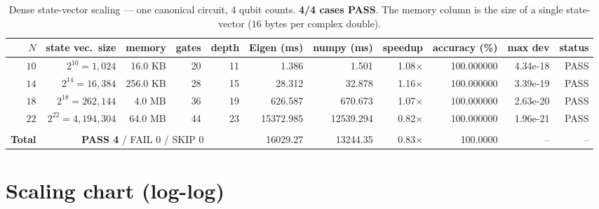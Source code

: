 \documentclass[11pt,a4paper]{article}
\begin{document}
\begin{table}[h]
\centering
\small
\setlength{\tabcolsep}{4pt}
\renewcommand{\arraystretch}{1.15}
\begin{tabular}{@{}r r r r r r r r r r r@{}}
\toprule
\(N\) & state vec.\ size & memory & gates & depth & Eigen (ms) & numpy (ms) & speedup & accuracy (\%) & max dev & status \\
\midrule[0.4pt]
  $10$ & $2^{10} = 1,024$ & 16.0 KB & 20 & 11 & 1.386 & 1.501 & 1.08$\times$ & 100.000000 & 4.34e-18 & PASS \\
\midrule[0.1pt]
  $14$ & $2^{14} = 16,384$ & 256.0 KB & 28 & 15 & 28.312 & 32.878 & 1.16$\times$ & 100.000000 & 3.39e-19 & PASS \\
\midrule[0.1pt]
  $18$ & $2^{18} = 262,144$ & 4.0 MB & 36 & 19 & 626.587 & 670.673 & 1.07$\times$ & 100.000000 & 2.63e-20 & PASS \\
\midrule[0.1pt]
  $22$ & $2^{22} = 4,194,304$ & 64.0 MB & 44 & 23 & 15372.985 & 12539.294 & 0.82$\times$ & 100.000000 & 1.96e-21 & PASS \\
\\ \midrule[0.4pt]
\textbf{Total} & \multicolumn{4}{c}{\textbf{PASS 4} / FAIL 0 / SKIP 0} & 16029.27 & 13244.35 & 0.83$\times$ & 100.0000 & -- & -- \\
\bottomrule
\end{tabular}
\caption{Dense state-vector scaling — one canonical circuit, 4 qubit counts. \textbf{4/4 cases PASS}. The memory column is the size of a single state-vector (\(16\) bytes per complex double).}
\end{table}

\section{Scaling chart (log-log)}
\end{document}

